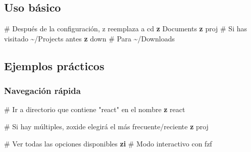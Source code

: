 \documentclass[
  11pt,
  letterpaper,
  oneside,
  openany]{scrbook}
\newenvironment{Shaded}{}{}
\newcommand{\BuiltInTok}[1]{\textcolor[rgb]{0.84,0.23,0.29}{#1}}
\newcommand{\CommentTok}[1]{\textcolor[rgb]{0.42,0.45,0.49}{#1}}
\newcommand{\ExtensionTok}[1]{\textcolor[rgb]{0.84,0.23,0.29}{\textbf{#1}}}
\newcommand{\NormalTok}[1]{\textcolor[rgb]{0.14,0.16,0.18}{#1}}
\newcommand{\StringTok}[1]{\textcolor[rgb]{0.01,0.18,0.38}{#1}}
\newcommand{\VariableTok}[1]{\textcolor[rgb]{0.89,0.38,0.04}{#1}}
\begin{document}
\begin{Shaded}
\end{Shaded}

\subsection{Uso básico}\label{uso-buxe1sico-2}

\begin{Shaded}
\begin{Highlighting}[]
\CommentTok{\# Después de la configuración, \textquotesingle{}z\textquotesingle{} reemplaza a \textquotesingle{}cd\textquotesingle{}}
\ExtensionTok{z}\NormalTok{ Documents}
\ExtensionTok{z}\NormalTok{ proj    }\CommentTok{\# Si has visitado \textasciitilde{}/Projects antes}
\ExtensionTok{z}\NormalTok{ down    }\CommentTok{\# Para \textasciitilde{}/Downloads}
\end{Highlighting}
\end{Shaded}

\subsection{Ejemplos prácticos}\label{ejemplos-pruxe1cticos-2}

\subsubsection{Navegación rápida}\label{navegaciuxf3n-ruxe1pida}

\begin{Shaded}
\begin{Highlighting}[]
\CommentTok{\# Ir a directorio que contiene "react" en el nombre}
\ExtensionTok{z}\NormalTok{ react}

\CommentTok{\# Si hay múltiples, zoxide elegirá el más frecuente/reciente}
\ExtensionTok{z}\NormalTok{ proj}

\CommentTok{\# Ver todas las opciones disponibles}
\ExtensionTok{zi}   \CommentTok{\# Modo interactivo con fzf}
\end{Highlighting}
\end{Shaded}
\end{document}
